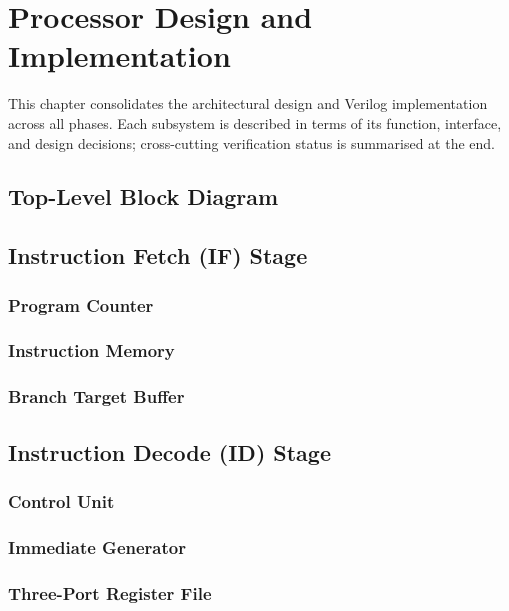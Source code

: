 \chapter{Processor Design and Implementation}
\label{ch:design}

This chapter consolidates the architectural design and Verilog
implementation across all phases. Each subsystem is described in terms
of its function, interface, and design decisions; cross-cutting
verification status is summarised at the end.

\section{Top-Level Block Diagram}

\section{Instruction Fetch (IF) Stage}
\subsection{Program Counter}
\subsection{Instruction Memory}
\subsection{Branch Target Buffer}

\section{Instruction Decode (ID) Stage}
\subsection{Control Unit}
\subsection{Immediate Generator}
\subsection{Three-Port Register File}
